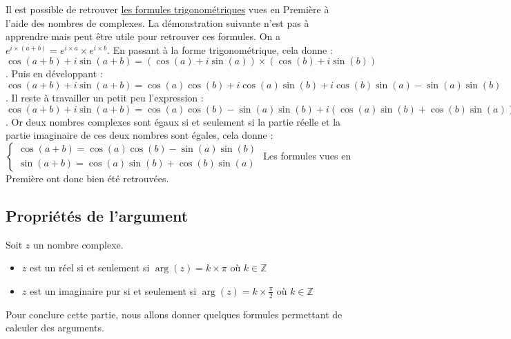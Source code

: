 	\begin{tip}
		\contentwidth[big]
		Il est possible de retrouver \href{https://bacomathiqu.es/cours/terminale/fonctions-trigonometriques/\#3-formules-de-trigonometrie}{les formules trigonométriques} vues en Première à l'aide des nombres de complexes. La démonstration suivante n'est pas à apprendre mais peut être utile pour retrouver ces formules.
		\newpar
		On a $e^{i \times (a + b)} = e^{i \times a} \times e^{i \times b}$.
		\newpar
		En passant à la forme trigonométrique, cela donne : $\cos(a + b) + i\sin(a + b) = (\cos(a) + i\sin(a)) \times (\cos(b) + i\sin(b))$.
		\newpar
		Puis en développant : $\cos(a + b) + i\sin(a + b) = \cos(a)\cos(b) + i\cos(a)\sin(b) + i\cos(b)\sin(a) - \sin(a)\sin(b)$.
		\newpar
		Il reste à travailler un petit peu l'expression : $\cos(a + b) + i\sin(a + b) = \cos(a)\cos(b) - \sin(a)\sin(b) + i(\cos(a)\sin(b) + \cos(b)\sin(a))$.
		\newpar
		Or deux nombres complexes sont égaux si et seulement si la partie réelle et la partie imaginaire de ces deux nombres sont égales, cela donne :
		\newpar
		$\begin{cases} \cos(a + b) = \cos(a)\cos(b) - \sin(a)\sin(b) \\ \sin(a + b) = \cos(a)\sin(b) + \cos(b)\sin(a) \end{cases}$
		\newpar
		Les formules vues en Première ont donc bien été retrouvées.
	\end{tip}

	\subsection{Propriétés de l'argument}

	\begin{formula}[Propriétés]
		Soit $z$ un nombre complexe.
		\begin{itemize}
			\item $z$ est un réel si et seulement si $\operatorname{arg}(z) = k \times \pi$ où $k \in \mathbb{Z}$
			\item $z$ est un imaginaire pur si et seulement si $\operatorname{arg}(z) = k \times \frac{\pi}{2}$ où $k \in \mathbb{Z}$
		\end{itemize}
	\end{formula}

	Pour conclure cette partie, nous allons donner quelques formules permettant de calculer des arguments.

